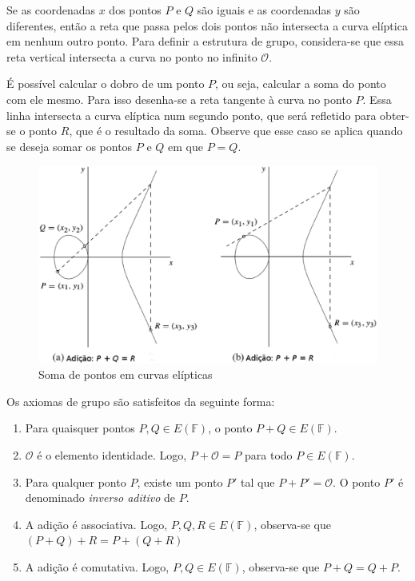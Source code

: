Se as coordenadas \(x\) dos pontos \(P\) e \(Q\) são iguais e as coordenadas $y$ são diferentes, então a reta que passa pelos dois pontos não intersecta a curva elíptica em nenhum outro ponto. Para definir a estrutura de grupo, considera-se que essa reta vertical intersecta a curva no ponto no infinito $\mathcal{O}$. \cite{Stallings:2011}

É possível calcular o dobro de um ponto \(P\), ou seja, calcular a soma do ponto com ele mesmo. Para isso desenha-se a reta tangente à curva no ponto \(P\). Essa linha intersecta a curva elíptica num segundo ponto, que será refletido para obter-se o ponto \(R\), que é o resultado da soma. \cite{Guide} Observe que esse caso se aplica quando se deseja somar os pontos $P$ e $Q$ em que $P=Q$.

\begin{figure}[h]
\includegraphics[scale=0.5, bb=0 0 484 636]{figuras/SomaECC.eps}
\caption{Soma de pontos em curvas elípticas}
\label{fig:pontos}
\end{figure}

Os axiomas de grupo são satisfeitos da seguinte forma:
\begin{enumerate}
  \item Para quaisquer pontos $P, Q \in E(\mathbb{F})$, o ponto $P + Q \in E(\mathbb{F})$.
  \item $\mathcal{O}$ é o elemento identidade. Logo, $P + \mathcal{O} = P$ para todo $P \in E(\mathbb{F})$.
  \item Para qualquer ponto \(P\), existe um ponto $P'$ tal que $P + P' = \mathcal{O}$. O ponto $P'$ é denominado \textit{inverso aditivo} de \(P\).
  \item A adição é associativa. Logo, $P, Q, R \in E(\mathbb{F})$, observa-se que $(P + Q) + R = P + (Q + R)$
  \item A adição é comutativa. Logo, $P, Q \in E(\mathbb{F})$, observa-se que $P + Q = Q + P$.
\end{enumerate}

